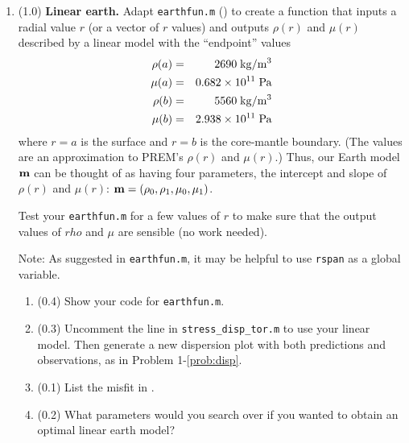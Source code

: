 \documentclass[11pt,titlepage,fleqn]{article}
\begin{document}
\begin{enumerate}
\label{prob:earth_homo}


\item (1.0) {\bf Linear earth.} Adapt \verb+earthfun.m+ () to create a function that inputs a radial value $r$ (or a vector of $r$ values) and outputs $\rho(r)$ and $\mu(r)$ described by a linear model with the ``endpoint'' values
%
\begin{eqnarray*}
\rho(a) &=& 2690 \; {\rm kg/m^3}
\\
\mu(a) &=& 0.682 \times 10^{11} \; {\rm Pa}
\\
\rho(b) &=& 5560 \; {\rm kg/m^3}
\\
\mu(b) &=& 2.938 \times 10^{11} \; {\rm Pa}
\end{eqnarray*}
%
where $r=a$ is the surface and $r=b$ is the core-mantle boundary. (The values are an approximation to PREM's $\rho(r)$ and $\mu(r)$.) Thus, our Earth model $\mbox{${\bf m}$}$ can be thought of as having four parameters, the intercept and slope of $\rho(r)$ and $\mu(r)$: $\mbox{${\bf m}$} = (\rho_0,\rho_1,\mu_0,\mu_1)$.

Test your \verb+earthfun.m+ for a few values of $r$ to make sure that the output values of $rho$ and $\mu$ are sensible (no work needed).

Note: As suggested in \verb+earthfun.m+, it may be helpful to use \verb+rspan+ as a global variable.

\begin{enumerate}
\item (0.4) Show your code for \verb+earthfun.m+.
\item (0.3) Uncomment the line in \verb+stress_disp_tor.m+ to use your linear model. Then generate a new dispersion plot with both predictions and observations, as in Problem 1-\ref{prob:disp}.
\item (0.1) List the misfit in .
\item (0.2) What parameters would you search over if you wanted to obtain an optimal linear earth model?
\end{enumerate}

\label{prob:earth_linear}



\end{enumerate}
\end{document}
